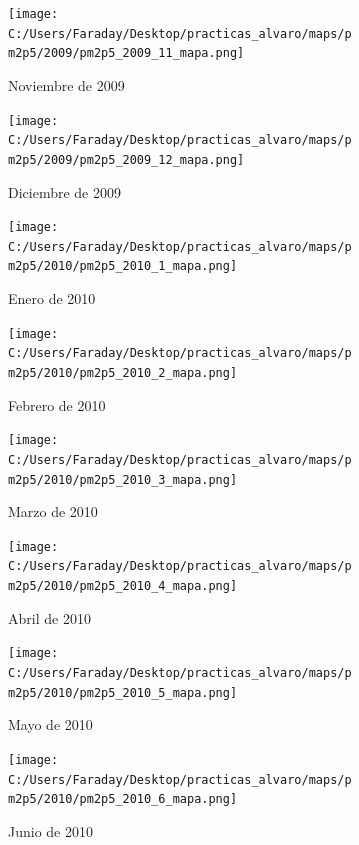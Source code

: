 \documentclass[12pt]{article}
\begin{document}
\begin{figure}[H]
\centering
\begin{subfigure}[h]{0.45\textwidth}
\texttt{[image: C:/Users/Faraday/Desktop/practicas\_alvaro/maps/pm2p5/2009/pm2p5\_2009\_11\_mapa.png]}
\caption{Noviembre de 2009}
\label{fig:map-mon-4-11-2009}
\end{subfigure}
%
\begin{subfigure}[H]{0.45\textwidth}
\texttt{[image: C:/Users/Faraday/Desktop/practicas\_alvaro/maps/pm2p5/2009/pm2p5\_2009\_12\_mapa.png]}
\caption{Diciembre de 2009}
\label{fig:map-mon-4-12-2009}
\end{subfigure}
\caption{}
\end{figure}

\newpage

\begin{figure}[H]
\centering
\begin{subfigure}[h]{0.45\textwidth}
\texttt{[image: C:/Users/Faraday/Desktop/practicas\_alvaro/maps/pm2p5/2010/pm2p5\_2010\_1\_mapa.png]}
\caption{Enero de 2010}
\label{fig:map-mon-4-1-2010}
\end{subfigure}
%
\begin{subfigure}[H]{0.45\textwidth}
\texttt{[image: C:/Users/Faraday/Desktop/practicas\_alvaro/maps/pm2p5/2010/pm2p5\_2010\_2\_mapa.png]}
\caption{Febrero de 2010}
\label{fig:map-mon-4-2-2010}
\end{subfigure}
\caption{}
\end{figure}

\begin{figure}[H]
\centering
\begin{subfigure}[h]{0.45\textwidth}
\texttt{[image: C:/Users/Faraday/Desktop/practicas\_alvaro/maps/pm2p5/2010/pm2p5\_2010\_3\_mapa.png]}
\caption{Marzo de 2010}
\label{fig:map-mon-4-3-2010}
\end{subfigure}
%
\begin{subfigure}[H]{0.45\textwidth}
\texttt{[image: C:/Users/Faraday/Desktop/practicas\_alvaro/maps/pm2p5/2010/pm2p5\_2010\_4\_mapa.png]}
\caption{Abril de 2010}
\label{fig:map-mon-4-4-2010}
\end{subfigure}
\caption{}
\end{figure}

\begin{figure}[H]
\centering
\begin{subfigure}[h]{0.45\textwidth}
\texttt{[image: C:/Users/Faraday/Desktop/practicas\_alvaro/maps/pm2p5/2010/pm2p5\_2010\_5\_mapa.png]}
\caption{Mayo de 2010}
\label{fig:map-mon-4-5-2010}
\end{subfigure}
%
\begin{subfigure}[H]{0.45\textwidth}
\texttt{[image: C:/Users/Faraday/Desktop/practicas\_alvaro/maps/pm2p5/2010/pm2p5\_2010\_6\_mapa.png]}
\caption{Junio de 2010}
\label{fig:map-mon-4-6-2010}
\end{subfigure}
\caption{}
\end{figure}
\end{document}
